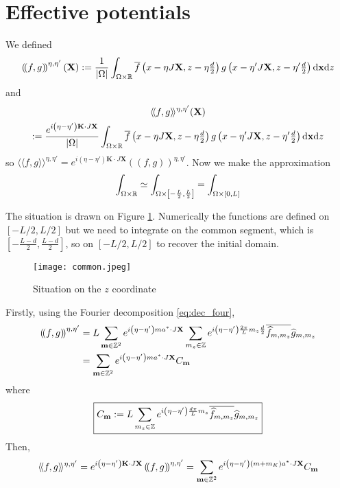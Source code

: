 \documentclass[11pt,a4paper,reqno,french,tikz]{amsart}
\def\d{{\rm d}}
\newcommand{\pa}[1]{\left( #1 \right)} %
\newcommand{\seg}[1]{\left[ #1 \right]} %
\newcommand{\ab}[1]{\left|#1\right|} %
\newcommand{\f}[2]{\frac{#1}{#2}} %
\newcommand{\db}[1]{\left(\!\left( #1 \right)\!\right)}
\def\bX{{\mathbf X}}
\def\bx{{\mathbf x}}
\def\bmm{{\mathbf m}}
\def\bK{{\mathbf K}}
\newcommand{\dd}{\tfrac{d}{2}}
\def\lAngle{\langle\!\langle}
\def\rAngle{\rangle\!\rangle}
\begin{document}
\section{Effective potentials}%
\label{sec:effective_potentials}

We defined
\begin{align*}
\db{ f, g}^{\eta,\eta'}(\bX) :=  \f{1}{\ab{\Omega}} \int_{\Omega \times \R} \overline{f}\pa{x -\eta J\bX,z- \eta\dd} g\pa{x - \eta' J \bX, z- \eta'\dd} \d \bx \d z
\end{align*}
and
\begin{multline*}
\lAngle f, g \rAngle^{\eta,\eta'}(\bX)\\
:=  \f{e^{i\pa{\eta-\eta'} \bK \cdot J \bX}}{\ab{\Omega}} \int_{\Omega \times \R} \overline{f}\pa{x -\eta J\bX,z-\eta \dd} g\pa{x -\eta' J \bX, z-\eta'\dd} \d \bx \d z
\end{multline*}
so $\lAngle f, g \rAngle^{\eta,\eta'} = e^{i\pa{\eta-\eta'} \bK \cdot J \bX}\db{ f, g}^{\eta,\eta'}$. Now we make the approximation
\begin{align*}
\int_{\Omega\times\R} \simeq \int_{\Omega\times \seg{-\f L2,\f L2}} = \int_{\Omega\times \seg{0,L}}
\end{align*}


The situation is drawn on Figure \ref{fig:z_drawing}. Numerically the functions are defined on $[-L/2,L/2]$ but we need to integrate on the common segment, which is $[-\f{L-d}{2},\f{L-d}{2}]$, so on $[-L/2,L/2]$ to recover the initial domain.

\begin{figure}
\begin{center}
\texttt{[image: common.jpeg]}
\label{fig:z_drawing}\caption{Situation on the $z$ coordinate}
\end{center}
\end{figure}


Firstly, using the Fourier decomposition \eqref{eq:dec_four},
\begin{align*}
	\db{f,g}^{\eta,\eta'} &=  L \sum_{\bmm \in \Z^2} e^{i\pa{\eta-\eta'} ma^* \cdot J \bX} \sum_{m_z \in \Z} e^{i\pa{\eta-\eta'} \f{2\pi}{L} m_z \f{d}{2}} \overline{\widehat{f}_{m,m_z}} \widehat{g}_{m,m_z}\\
& = \sum_{\bmm \in \Z^2} e^{i\pa{\eta-\eta'} ma^* \cdot J \bX} C_\bmm
\end{align*}
where
\begin{align*}
\boxed{C_\bmm := L \sum_{m_z \in \Z} e^{i\pa{\eta-\eta'} \f{d\pi}{L} m_z} \overline{\widehat{f}_{m,m_z}} \widehat{g}_{m,m_z}}
\end{align*}
Then,
\begin{align*}
\lAngle f,g \rAngle ^{\eta,\eta'} = e^{i\pa{\eta-\eta'} \bK \cdot J \bX}\db{f,g}^{\eta,\eta'} =  \sum_{\bmm \in \Z^2} e^{i\pa{\eta-\eta'} \pa{m+m_K}a^* \cdot J \bX} C_\bmm
\end{align*}
\end{document}
